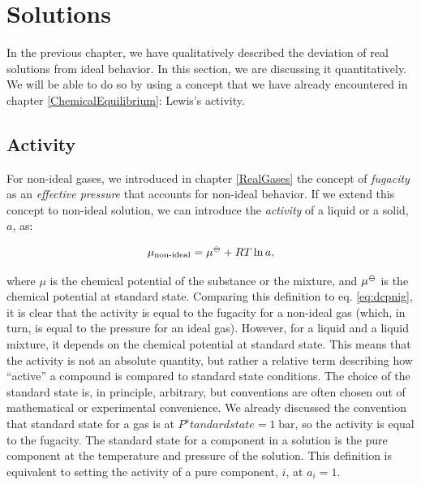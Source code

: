 \documentclass[
  9pt,
]{extbook}
\theoremstyle{definition}
\theoremstyle{definition}
\theoremstyle{definition}
\theoremstyle{remark}
\begin{document}
\renewcommand*{\standardstate}{{-\kern-6pt{\ominus}\kern-6pt-}}

\hypertarget{Solutions}{%
\chapter{Solutions}\label{Solutions}}

In the previous chapter, we have qualitatively described the deviation of real solutions from ideal behavior. In this section, we are discussing it quantitatively. We will be able to do so by using a concept that we have already encountered in chapter \ref{ChemicalEquilibrium}: Lewis's activity.

\hypertarget{activity}{%
\section{Activity}\label{activity}}

For non-ideal gases, we introduced in chapter \ref{RealGases} the concept of \emph{fugacity} as an \emph{effective pressure} that accounts for non-ideal behavior. If we extend this concept to non-ideal solution, we can introduce the \emph{activity} of a liquid or a solid, \(a\), as:

\begin{equation}
\mu_{\text{non-ideal}} = \mu^{{-\kern-6pt{\ominus}\kern-6pt-}} + RT \ln a,
\label{eq:act1}
\end{equation}

where \(\mu\) is the chemical potential of the substance or the mixture, and \(\mu^{{-\kern-6pt{\ominus}\kern-6pt-}}\) is the chemical potential at standard state. Comparing this definition to eq. \eqref{eq:dcpnig}, it is clear that the activity is equal to the fugacity for a non-ideal gas (which, in turn, is equal to the pressure for an ideal gas). However, for a liquid and a liquid mixture, it depends on the chemical potential at standard state. This means that the activity is not an absolute quantity, but rather a relative term describing how ``active'' a compound is compared to standard state conditions. The choice of the standard state is, in principle, arbitrary, but conventions are often chosen out of mathematical or experimental convenience. We already discussed the convention that standard state for a gas is at \(P^standardstate=1\;\text{bar}\), so the activity is equal to the fugacity. The standard state for a component in a solution is the pure component at the temperature and pressure of the solution. This definition is equivalent to setting the activity of a pure component, \(i\), at \(a_i=1\).
\end{document}
